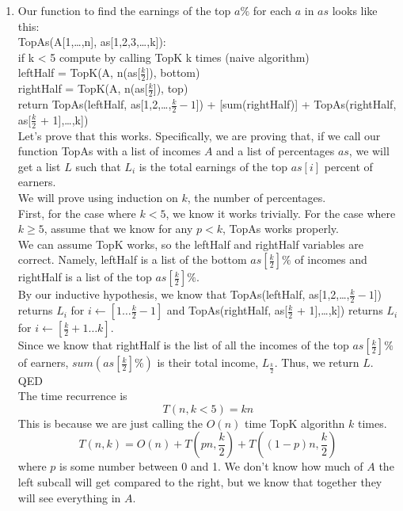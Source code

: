 \documentclass[11pt]{article}
\begin{document}
\begin{solution}
\begin{enumerate}
        \item Our function to find the earnings of the top $a\%$ for each $a$ in $as$ looks like this: \\
            TopAs(A[1,\ldots,n], as[1,2,3,\ldots,k]): \\
            if k < 5 compute by calling TopK k times (naive algorithm) \\
            leftHalf = TopK(A, n(as[$\frac{k}{2}$]), bottom) \\
            rightHalf = TopK(A, n(as[$\frac{k}{2}$]), top) \\
            return TopAs(leftHalf, as[1,2,\ldots,$\frac{k}{2} - 1$]) + [sum(rightHalf)] + TopAs(rightHalf, as[$\frac{k}{2}$ + 1],\ldots,k]) \\

            Let's prove that this works. Specifically, we are proving that, if we call our function TopAs with a list of incomes $A$ and a list of percentages $as$, we will get a list $L$ such that $L_i$ is the total earnings of the top $as[i]$ percent of earners. \\
            We will prove using induction on $k$, the number of percentages. \\
            First, for the case where $k < 5$, we know it works trivially. 
            For the case where $k \geq 5$, assume that we know for any $p < k$, TopAs works properly. \\
            We can assume TopK works, so the leftHalf and rightHalf variables are correct. Namely, leftHalf is a list of the bottom $as[\frac{k}{2}]\%$ of incomes and rightHalf is a list of the top $as[\frac{k}{2}]\%$. \\
            By our inductive hypothesis, we know that TopAs(leftHalf, as[1,2,\ldots,$\frac{k}{2} - 1$]) returns $L_i$ for $i \leftarrow [1\ldots \frac{k}{2} - 1]$ and TopAs(rightHalf, as[$\frac{k}{2}$ + 1],\ldots,k]) returns $L_i$ for $i \leftarrow [\frac{k}{2} + 1\ldots k]$. \\
            Since we know that rightHalf is the list of all the incomes of the top $as[\frac{k}{2}]\%$ of earners, $sum(as[\frac{k}{2}]\%)$ is their total income, $L_\frac{k}{2}$. Thus, we return $L$. \\
            QED \\

            The time recurrence is 
            \[
                T(n, k < 5) = kn
            \]
            This is because we are just calling the $O(n)$ time TopK algorithn $k$ times.
            \[
                T(n, k) = O(n) + T\left(pn, \frac{k}{2}\right) + T\left((1 - p)n, \frac{k}{2}\right)
            \]
            where $p$ is some number between 0 and 1. We don't know how much of $A$ the left subcall will get compared to the right, but we know that together they will see everything in $A$. \\


\end{enumerate}
\end{solution}
\end{document}
